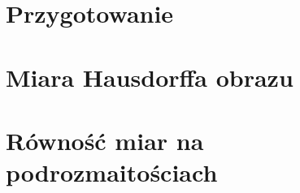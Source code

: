 \section{Przygotowanie}

\bigbreak

\bigbreak

\bigbreak

\bigbreak


\section{Miara Hausdorffa obrazu}

\bigbreak

\bigbreak

\bigbreak

\section{Równość miar na podrozmaitościach}

